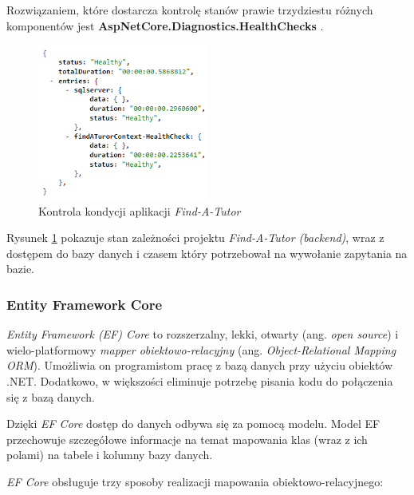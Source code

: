 \documentclass[12pt]{article}
\numberwithin{figure}{section}
\begin{document}
\begin{sloppypar}
Rozwiązaniem, które dostarcza kontrolę stanów prawie trzydziestu różnych komponentów jest \textbf{AspNetCore.Diagnostics.HealthChecks} \cite{health-checks-github}.
        
\begin{figure}[H] 
    \centering
    \includegraphics[width=0.5\textwidth]{images/chapter_3/api-health-check.png}
    \caption{Kontrola kondycji aplikacji \textit{Find-A-Tutor}}
    \label{fig:health-check}
\end{figure}
    
Rysunek \ref{fig:health-check} pokazuje stan zależności projektu \textit{Find-A-Tutor (backend)}, wraz z dostępem do bazy danych i czasem który potrzebował na wywołanie zapytania na bazie.

\label{EF}
\subsubsection{Entity Framework Core}
\textit{Entity Framework (EF) Core} to rozszerzalny, lekki, otwarty (ang. \textit{open source}) i wielo-platformowy \textit{mapper obiektowo-relacyjny} (ang. \textit{Object-Relational Mapping ORM}). Umożliwia on programistom pracę z bazą danych przy użyciu obiektów .NET. Dodatkowo, w większości eliminuje potrzebę pisania kodu do połączenia się z bazą danych. 
    
Dzięki \textit{EF Core} dostęp do danych odbywa się za pomocą modelu. Model EF przechowuje szczegółowe informacje na temat mapowania klas (wraz z ich polami) na tabele i kolumny bazy danych.
    
\textit{EF Core} obsługuje trzy sposoby realizacji mapowania obiektowo-relacyjnego:
    

\end{sloppypar}
\end{document}
